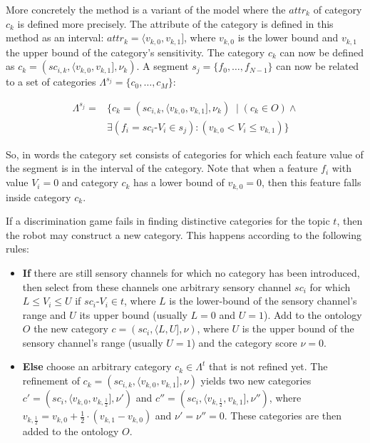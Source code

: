 More concretely the method is a variant of the model where the $attr_k$ of category $c_k$ is defined more precisely. The attribute of the category is defined in this method as an interval: $attr_k=\langle v_{k,0},v_{k,1}]$, where $v_{k,0}$ is the lower bound and $v_{k,1}$ the upper bound of the category's sensitivity. The category $c_k$ can now be defined as $c_k=(sc_{i,k},\langle v_{k,0},v_{k,1}],\nu_k)$. A segment $s_j=\{f_0,\ldots,f_{N-1}\}$ can now be related to a set of categories $\Lambda^{s_j}=\{c_0,\ldots,c_M\}$:

\begin{eqnarray}
\Lambda^{s_j}=&\{c_k=(sc_{i,k},\langle v_{k,0},v_{k,1}],\nu_k)\; \mid (c_k \in O) \wedge\\
& \exists (f_i=sc_i\mbox{-}V_i \in s_j): (v_{k,0} < V_i \leq v_{k,1})\} \nonumber
\end{eqnarray}

\p
So, in words the category set consists of categories for which each feature value of the segment is in the interval of the category. Note that when a feature $f_i$ with value $V_i=0$ and category $c_k$ has a lower bound of $v_{k,0}=0$, then this feature falls inside category $c_k$.

If a discrimination game fails in finding distinctive categories for the topic $t$, then the robot may construct a new category. This happens according to the following rules:

\begin{itemize}
\item {\bf If} there are still sensory channels for which no category has been introduced, then select from these channels one arbitrary sensory channel $sc_i$ for which $L \leq V_i \leq U$ if $sc_i$-$V_i \in t$, where $L$ is the lower-bound of the sensory channel's range and $U$ its upper bound (usually $L=0$ and $U=1$). Add to the ontology $O$ the new category $c=(sc_i,\langle L,U],\nu)$, where $U$ is the upper bound of the sensory channel's range (usually $U=1$) and the category score $\nu=0$.
\item {\bf Else} choose an arbitrary category $c_k \in \Lambda^t$ that is not refined yet. The refinement of $c_k=(sc_{i,k},\langle v_{k,0},v_{k,1}],\nu)$ yields two new categories $c'=(sc_i,\langle v_{k,0},v_{k,\frac{1}{2}}],\nu')$ and $c''=(sc_i,\langle v_{k,\frac{1}{2}},v_{k,1}],\nu'')$, where $v_{k,\frac{1}{2}}=v_{k,0}+\frac{1}{2}\cdot(v_{k,1}-v_{k,0})$ and $\nu'=\nu''=0$. These categories are then added to the ontology $O$.
\end{itemize}

